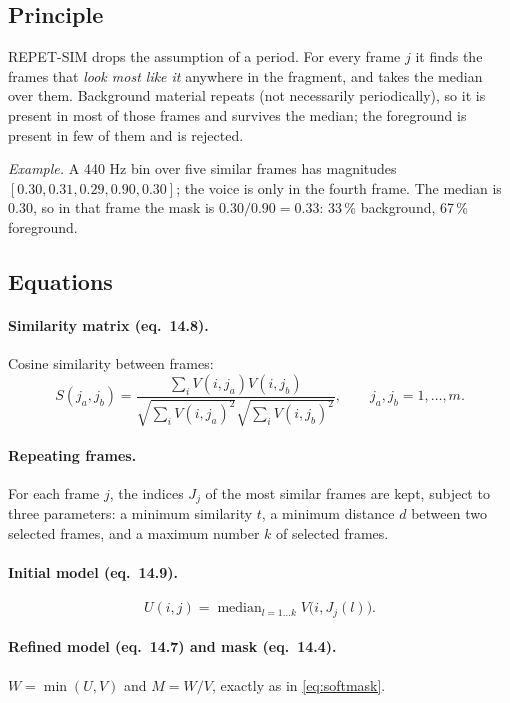 \documentclass[11pt,a4paper]{article}
\DeclareMathOperator*{\median}{median}
\begin{document}
\subsection{Principle}
REPET-SIM drops the assumption of a period. For every frame $j$ it finds
the frames that \emph{look most like it} anywhere in the fragment, and
takes the median over them. Background material repeats (not necessarily
periodically), so it is present in most of those frames and survives the
median; the foreground is present in few of them and is rejected.

\emph{Example.} A 440 Hz bin over five similar frames has magnitudes
$[0.30,0.31,0.29,\mathbf{0.90},0.30]$; the voice is only in the fourth
frame. The median is $0.30$, so in that frame the mask is
$0.30/0.90=0.33$: 33\,\% background, 67\,\% foreground.

\subsection{Equations}
\paragraph{Similarity matrix (eq.~14.8).} Cosine similarity between
frames:
\begin{equation}
  S(j_a,j_b)=\frac{\sum_i V(i,j_a)V(i,j_b)}
  {\sqrt{\sum_i V(i,j_a)^2}\sqrt{\sum_i V(i,j_b)^2}},
  \qquad j_a,j_b=1,\dots,m .
\end{equation}

\paragraph{Repeating frames.} For each frame $j$, the indices $J_j$ of
the most similar frames are kept, subject to three parameters: a minimum
similarity $t$, a minimum distance $d$ between two selected frames, and a
maximum number $k$ of selected frames.

\paragraph{Initial model (eq.~14.9).}
\begin{equation}
  U(i,j)=\median_{l=1\dots k} V\big(i,J_j(l)\big).
\end{equation}

\paragraph{Refined model (eq.~14.7) and mask (eq.~14.4).}
$W=\min(U,V)$ and $M=W/V$, exactly as in \cref{eq:softmask}.
\end{document}
